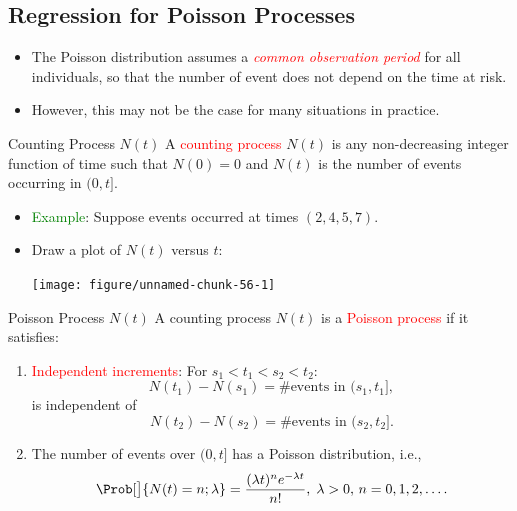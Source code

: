 \documentclass{article}\usepackage[]{graphicx}\usepackage[svgnames]{xcolor}
\newenvironment{knitrout}{}{} %
\begin{document}
\subsection*{Regression for Poisson Processes}
\begin{itemize}
      \item The Poisson distribution assumes a \textcolor{Red}{\emph{common observation period}} for all individuals,
            so that the number of event does not depend on the time at risk.
      \item However, this may not be the case for many situations in practice.
\end{itemize}
\begin{Regular}{Counting Process $ N(t) $}
      A \textcolor{Red}{counting process} $ N(t) $ is any non-decreasing integer function of time such that
      $ N(0)=0 $ and $ N(t) $ is the number of events occurring in $ (0,t] $.
\end{Regular}
\begin{itemize}
      \item \textcolor{Green}{Example}: Suppose events occurred at times $ (2,4,5,7) $.
      \item Draw a plot of $ N(t) $ versus $ t $:
\begin{knitrout}
\color{fgcolor}

{\centering \texttt{[image: figure/unnamed-chunk-56-1]} 

}


\end{knitrout}
\end{itemize}
\begin{Regular}{Poisson Process $ N(t) $}
      A counting process $ N(t) $ is a \textcolor{Red}{Poisson process} if it satisfies:
      \begin{enumerate}[1.]
            \item \textcolor{Red}{Independent increments}: For $ s_1<t_1<s_2<t_2 $:
                  \[ N(t_1)-N(s_1)=\text{\# events in $(s_1,t_1]$}, \]
                  is independent of
                  \[ N(t_2)-N(s_2)=\text{\# events in $(s_2,t_2]$}. \]
            \item The number of events over $ (0,t] $ has a Poisson distribution, i.e.,
                  \[ \Prob[\big]{N(t)=n;\lambda}=\frac{(\lambda t)^n e^{-\lambda t}}{n!},\; \lambda>0,\, n=0,1,2,\ldots.  \]
      \end{enumerate}
\end{Regular}
\end{document}
